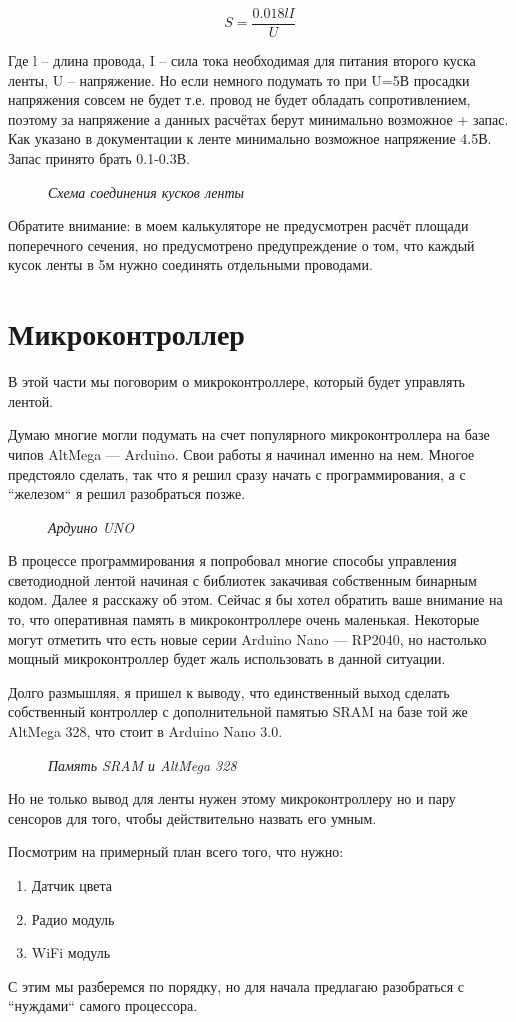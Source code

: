 \documentclass[a4paper, 12pt]{article}
\newcommand{\image}[3]{\begin{figure}[h!]\center{\texttt{[image: \#1]} }\caption{\textit{#3}}\end{figure}}
\begin{document}
$$S=\frac{0.018lI}{U}$$

Где l -- длина провода, I -- сила тока необходимая для питания второго куска ленты, 
U -- напряжение. Но если немного подумать то при U=5В просадки напряжения совсем 
не будет т.е. провод не будет обладать сопротивлением, поэтому за напряжение а 
данных расчётах берут минимально возможное + запас. Как указано в документации 
к ленте минимально возможное напряжение 4.5В. Запас принято брать 0.1-0.3В.

\image{схема_для_кусков.jpg}{70}{Схема соединения кусков ленты}

Обратите внимание: в моем калькуляторе не предусмотрен расчёт площади 
поперечного сечения, но предусмотрено предупреждение о том, что каждый кусок 
ленты в 5м нужно соединять отдельными проводами.

\newpage

\section{Микроконтроллер}

В этой части мы поговорим о микроконтроллере, который будет управлять лентой.

Думаю многие могли подумать на счет популярного микроконтроллера на базе чипов 
AltMega — Arduino. Свои работы я начинал именно на нем. Многое предстояло 
сделать, так что я решил сразу начать с программирования, а с “железом“ я решил
разобраться позже.

\image{arduino.jpg}{120}{Ардуино UNO}

В процессе программирования я попробовал многие способы управления светодиодной 
лентой начиная с библиотек закачивая собственным бинарным кодом. Далее я 
расскажу об этом. Сейчас я бы хотел обратить ваше внимание на то, что 
оперативная память в микроконтроллере очень маленькая. Некоторые могут отметить 
что есть новые серии Arduino Nano — RP2040, но настолько мощный микроконтроллер 
будет жаль использовать в данной ситуации. 

Долго размышляя, я пришел к выводу, что единственный выход сделать собственный 
контроллер с дополнительной памятью SRAM на базе той же AltMega 328, что стоит 
в Arduino Nano 3.0.

\image{sram&altmega.jpg}{120}{Память SRAM и AltMega 328}

Но не только вывод для ленты нужен этому микроконтроллеру но и пару сенсоров 
для того, чтобы действительно назвать его умным.

Посмотрим на примерный план всего того, что нужно:
\begin{enumerate}
\item Датчик цвета
\item Радио модуль
\item WiFi модуль
\end{enumerate}
С этим мы разберемся по порядку, но для начала предлагаю разобраться с 
“нуждами“ самого процессора.
\end{document}
